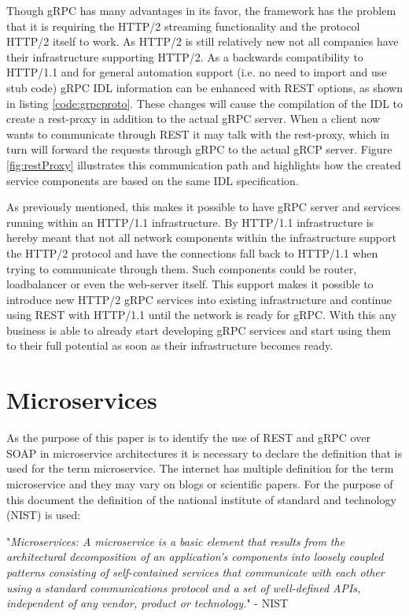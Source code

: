 \documentclass[conference]{IEEEtran}
\begin{document}
Though gRPC has many advantages in its favor, the framework has the problem that it is requiring the HTTP/2 streaming functionality and the protocol HTTP/2 itself to work. As HTTP/2 is still relatively new not all companies have their infrastructure supporting HTTP/2. As a backwards compatibility to HTTP/1.1 and for general automation support (i.e. no need to import and use stub code) gRPC IDL information can be enhanced with REST options, as shown in listing \ref{code:grpcproto}. These changes will cause the compilation of the IDL to create a rest-proxy in addition to the actual gRPC server. When a client now wants to communicate through REST it may talk with the rest-proxy, which in turn will forward the requests through gRPC to the actual gRCP server. Figure \ref{fig:restProxy} illustrates this communication path and highlights how the created service components are based on the same IDL specification.

As previously mentioned, this makes it possible to have gRPC server and services running within an HTTP/1.1 infrastructure. By HTTP/1.1 infrastructure is hereby meant that not all network components within the infrastructure support the HTTP/2 protocol and have the connections fall back to HTTP/1.1 when trying to communicate through them. Such components could be router, loadbalancer or even the web-server itself. This support makes it possible to introduce new HTTP/2 gRPC services into existing infrastructure and continue using REST with HTTP/1.1 until the network is ready for gRPC. With this any business is able to already start developing gRPC services and start using them to their full potential as soon as their infrastructure becomes ready.

\section{Microservices}
\label{sec:micros}

As the purpose of this paper is to identify the use of REST and gRPC over SOAP in microservice architectures it is necessary to declare the definition that is used for the term microservice. The internet has multiple definition for the term microservice and they may vary on blogs or scientific papers. For the purpose of this document the definition of the national institute of standard and technology (NIST) is used:

"\emph{Microservices: A microservice is a basic element that results from the architectural decomposition of an application’s components into loosely coupled patterns consisting of self-contained services that communicate with each other using a standard communications protocol and a set of well-defined APIs, independent of any vendor, product or technology.}" - NIST \cite{karmel2016nist}
\end{document}
